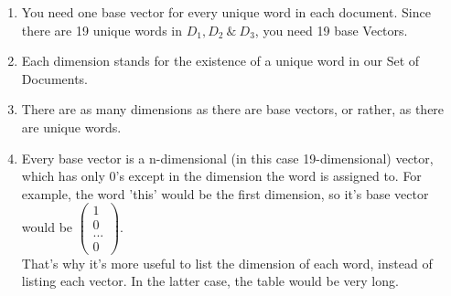 \documentclass{WeSTassignment}
\begin{document}
\begin{enumerate}
\item You need one base vector for every unique word in each document. Since there are 19 unique words in $D_1, D_2~\&~D_3$, you need 19 base Vectors.
\item Each dimension stands for the existence of a unique word in our Set of Documents.
\item There are as many dimensions as there are base vectors, or rather, as there are unique words.
\item Every base vector is a n-dimensional (in this case 19-dimensional) vector, which has only 0's except in the dimension the word is assigned to. For example, the word 'this' would be the first dimension, so it's base vector would be $\begin{pmatrix} 1 \\ 0 \\ ... \\ 0 \end{pmatrix}$.\\
That's why it's more useful to list the dimension of each word, instead of listing each vector. In the latter case, the table would be very long.


\end{enumerate}
\end{document}
